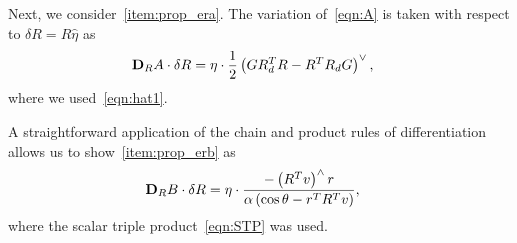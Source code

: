 \documentclass[fleqn]{IJCAS}  %
\begin{document}
\begin{multicols}{2}
Next, we consider~\cref{item:prop_era}.
The variation of~\cref{eqn:A} is taken with respect to \( \delta R = R \hat \eta \) as
\begin{align*}
	\mathbf{D}_{R} A \cdot \delta R &= \eta \cdot \frac{1}{2} \left( G R_d^T R - R^T R_d G\right)^\vee ,
\end{align*}
where we used~\cref{eqn:hat1}.

A straightforward application of the chain and product rules of differentiation allows us to show~\cref{item:prop_erb} as
\begin{align*}
	\mathbf{D}_{R} B \cdot \delta R &=  \eta \cdot \frac{ - \left( R^T v\right)^\wedge r}{\alpha \left(\cos \theta - r^T R^T v \right)} ,
\end{align*}
where the scalar triple product~\cref{eqn:STP} was used.



\end{multicols}
\end{document}
